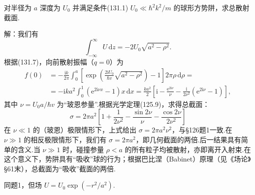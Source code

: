 \begin{xiti}

\quad 对半径为 $a$ 深度为 $U_0$ 并满足条件(131.1) $U_0\ll\hbar^2k^2/m$ 的球形方势阱，求总散射截面.

解：我们有
\begin{equation*}
  \int_{-\infty}^{\infty}U\,\mathrm{d}z=-2U_0\sqrt{a^2-\rho^2}.
\end{equation*}
根据(131.7)，向前散射振幅（$q=0$）为
\begin{equation*}
\begin{aligned}
  f(0)&=-\frac{\mathrm{i}k}{2\pi}\int_0^{a}
  \left[\exp\left(\frac{2\mathrm{i}U_0}{\hbar v}\sqrt{a^2-\rho^2}\right)-1\right]
  2\pi\rho\,\mathrm{d}\rho=\\
  &=-\mathrm{i}ka^2\int_0^{1}\left(\mathrm{e}^{2\mathrm{i}\nu x}-1\right)
  x\,\mathrm{d}x
  =\frac{ka^2}{2}\left[\mathrm{i}-\frac{\mathrm{e}^{2\mathrm{i}\nu}}{\nu}
  -\frac{\mathrm{i}}{2\nu^2}\left(\mathrm{e}^{2\mathrm{i}\nu}-1\right)\right],
\end{aligned}
\end{equation*}
其中 $\nu=U_0a/\hbar v$ 为“玻恩参量”.根据光学定理(125.9)，求得总截面：
\begin{equation*}
  \sigma=2\pi a^2\left[1+\frac{1}{2\nu^2}
  -\frac{\sin 2\nu}{\nu}-\frac{\cos 2\nu}{2\nu^2}\right]
\end{equation*}
在 $\nu\ll1$ 的（玻恩）极限情形下，上式给出 $\sigma=2\pi a^2\nu^2$，与§126题1一致.在 $\nu\gg1$ 的相反极限情形下，我们有 $\sigma=2\pi a^2$，即几何截面的两倍.后一结果具有简单的含义.当 $\nu\gg1$ 时，碰撞参量 $\rho<a$ 的所有粒子均被散射，亦即离开入射束.在这个意义下，势阱具有“吸收”球的行为；根据巴比涅（Babinet）原理（见《场论》§61末），总截面为“吸收”截面的两倍.

\quad 同题1，但场 $U=U_0\exp(-r^2/a^2)$.


\end{xiti}
